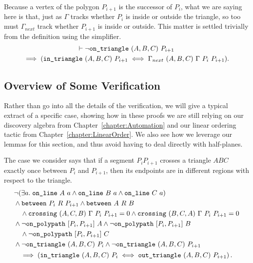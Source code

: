Because a vertex of the polygon $P_{i+1}$ is the successor of $P_i$, what we are saying here is that, just as $\Gamma$ tracks whether $P_i$ is inside or outside the triangle, so too must $\Gamma_{next}$ track whether $P_{i+1}$ is inside or outside. This matter is settled trivially from the definition using the simplifier.
\begin{multline*}
\vdash\neg\texttt{on\_triangle}\ (A,B,C)\ P_{i+1}\\
\implies (\texttt{in\_triangle}\ (A,B,C)\ P_{i+1} \iff \Gamma_{next}\ (A,B,C)\ \Gamma\ P_i\ P_{i+1}).
\end{multline*}

\subsection{Overview of Some Verification}
Rather than go into all the details of the verification, we will give a typical extract of a specific case, showing how in these proofs we are still relying on our discovery algebra from Chapter~\ref{chapter:Automation} and our linear ordering tactic from Chapter~\ref{chapter:LinearOrder}. We also see how we leverage our lemmas for this section, and thus avoid having to deal directly with half-planes.

The case we consider says that if a segment $P_iP_{i+1}$ crosses a triangle $ABC$ exactly once between $P_i$ and $P_{i+1}$, then its endpoints are in different regions with respect to the triangle. 
\begin{multline}\label{eq:IH3}
  \begin{aligned}
    &\neg(\exists a.\; \texttt{on\_line}\ A\ a\wedge \texttt{on\_line}\ B\ a\wedge \texttt{on\_line}\ C\ a)\\
    &\wedge\texttt{between}\ P_i\ R\ P_{i+1} \wedge \texttt{between}\ A\ R\ B \\
    &\quad\wedge\texttt{crossing}\ (A,C,B)\ \Gamma\ P_i\ P_{i+1} = 0\wedge\texttt{crossing}\ (B,C,A)\ \Gamma\ P_i\ P_{i+1} = 0\\
    &\wedge\neg\texttt{on\_polypath}\ [P_i,P_{i+1}]\ A \wedge \neg\texttt{on\_polypath}\ [P_i,P_{i+1}]\ B \\
    &\quad\wedge \neg\texttt{on\_polypath}\ [P_i,P_{i+1}]\ C\\
    &\wedge\neg\texttt{on\_triangle}\ (A,B,C)\ P_i \wedge\neg\texttt{on\_triangle}\ (A,B,C)\ P_{i+1}
  \end{aligned}\\
  \implies\left(\texttt{in\_triangle}\ (A,B,C)\ P_i \iff \texttt{out\_triangle}\ (A,B,C)\ P_{i+1}\right).
\end{multline}

